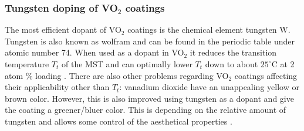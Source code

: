 \subsubsection{Tungsten doping of VO$_2$ coatings} \label{sec:vo2}
The most efficient dopant of VO$_2$ coatings is the chemical element tungsten W. 
Tungsten is also known as wolfram and can be found in the periodic table
under atomic number 74. When used as a dopant in VO$_2$ it reduces the transition temperature $T_t$
of the MST and can optimally lower $T_t$ down to about $25^{\circ}$C at 2 atom \% loading
\cite[p.~4566]{Blackman2009}. 
%
There are also other problems regarding VO$_2$ coatings affecting their applicability other than $T_t$: 
vanadium dioxide have an unappealing yellow or brown color. However, this is also improved using
tungsten as a dopant and give the coating a greener/bluer color. This is depending on the relative
amount of tungsten and allows some control of the aesthetical properties \cite[p.~4565,4569]{Blackman2009}.


